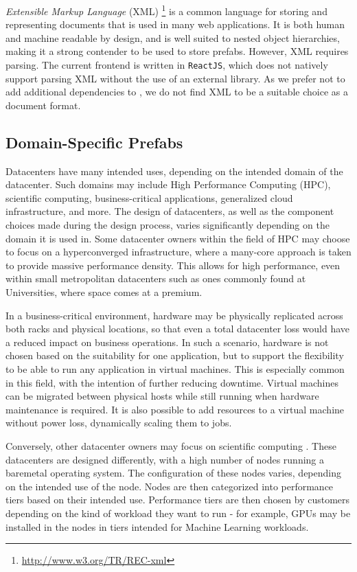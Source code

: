 \documentclass[11pt]{article}
\begin{document}
		\textit{Extensible Markup Language} (XML) \footnote{\url{http://www.w3.org/TR/REC-xml}} is a common language for storing and representing documents that is used in many web applications.
		It is both human and machine readable by design, and is well suited to nested object hierarchies, making it a strong contender to be used to store prefabs.
		However, XML requires parsing.
		The current \opendc{} frontend is written in \verb|ReactJS|, which does not natively support parsing XML without the use of an external library.
		As we prefer not to add additional dependencies to \opendc{}, we do not find XML to be a suitable choice as a document format.
	
	\subsection{Domain-Specific Prefabs}
		Datacenters have many intended uses, depending on the intended domain of the datacenter.
		Such domains may include High Performance Computing (HPC), scientific computing, business-critical applications, generalized cloud infrastructure, and more.
		The design of datacenters, as well as the component choices made during the design process, varies significantly depending on the domain it is used in.
		Some datacenter owners within the field of HPC may choose to focus on a hyperconverged infrastructure, where a many-core approach is taken to provide massive performance density.
		This allows for high performance, even within small metropolitan datacenters such as ones commonly found at Universities, where space comes at a premium.

		In a business-critical environment, hardware may be physically replicated across both racks and physical locations, so that even a total datacenter loss would have a reduced impact on business operations.
		In such a scenario, hardware is not chosen based on the suitability for one application, but to support the flexibility to be able to run any application in virtual machines.
		This is especially common in this field, with the intention of further reducing downtime.
		Virtual machines can be migrated between physical hosts while still running when hardware maintenance is required.
		It is also possible to add resources to a virtual machine without power loss, dynamically scaling them to jobs.

		Conversely, other datacenter owners may focus on scientific computing \cite{SURF2020}.
		These datacenters are designed differently, with a high number of nodes running a baremetal operating system.
		The configuration of these nodes varies, depending on the intended use of the node.
		Nodes are then categorized into performance tiers based on their intended use.
		Performance tiers are then chosen by customers depending on the kind of workload they want to run - for example, GPUs may be installed in the nodes in tiers intended for Machine Learning workloads.
\end{document}
